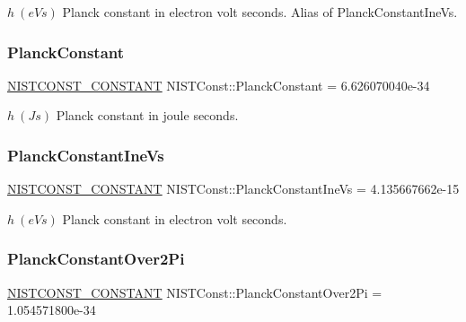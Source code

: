 $h \ (eV s)$ Planck constant in electron volt seconds. Alias of Planck\+Constant\+Ine\+Vs. \mbox{\label{group___n_i_s_t_const-_planck_constant_ga469d9f8b9dfa5e6b73a460bddd16a0ed}} 
\subsubsection{\texorpdfstring{Planck\+Constant}{PlanckConstant}}
{\footnotesize\ttfamily \mbox{\hyperlink{group___n_i_s_t_const-_macros_ga2b0fc1d7452373f816175dd86ce26729}{N\+I\+S\+T\+C\+O\+N\+S\+T\+\_\+\+C\+O\+N\+S\+T\+A\+NT}} N\+I\+S\+T\+Const\+::\+Planck\+Constant = 6.\+626070040e-\/34}

$h \ (J s)$ Planck constant in joule seconds. \mbox{\label{group___n_i_s_t_const-_planck_constant_ga31cde6b55e68a183fd7c8178ac6414cc}} 
\subsubsection{\texorpdfstring{Planck\+Constant\+Ine\+Vs}{PlanckConstantIneVs}}
{\footnotesize\ttfamily \mbox{\hyperlink{group___n_i_s_t_const-_macros_ga2b0fc1d7452373f816175dd86ce26729}{N\+I\+S\+T\+C\+O\+N\+S\+T\+\_\+\+C\+O\+N\+S\+T\+A\+NT}} N\+I\+S\+T\+Const\+::\+Planck\+Constant\+Ine\+Vs = 4.\+135667662e-\/15}

$h \ (eV s)$ Planck constant in electron volt seconds. \mbox{\label{group___n_i_s_t_const-_planck_constant_ga5a867434631f04938ff7d86ae9107a0b}} 
\subsubsection{\texorpdfstring{Planck\+Constant\+Over2\+Pi}{PlanckConstantOver2Pi}}
{\footnotesize\ttfamily \mbox{\hyperlink{group___n_i_s_t_const-_macros_ga2b0fc1d7452373f816175dd86ce26729}{N\+I\+S\+T\+C\+O\+N\+S\+T\+\_\+\+C\+O\+N\+S\+T\+A\+NT}} N\+I\+S\+T\+Const\+::\+Planck\+Constant\+Over2\+Pi = 1.\+054571800e-\/34}

